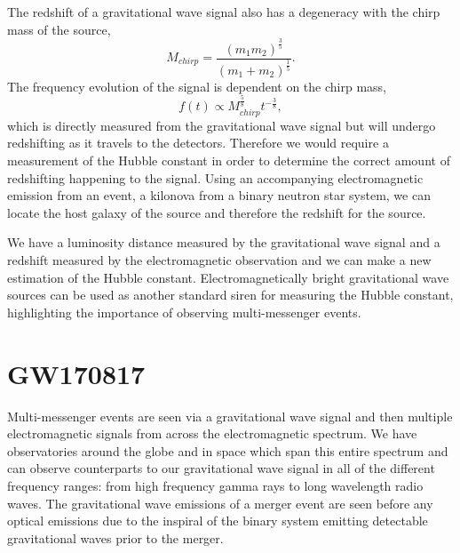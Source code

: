 The redshift of a gravitational wave signal also has a degeneracy with the chirp mass of the source,
%
\begin{equation}
M_{chirp} = \frac{(m_1 m_2)^{\frac{3}{5}}}{(m_1 + m_2)^{\frac{1}{5}}}.
\end{equation}
%
The frequency evolution of the signal is dependent on the chirp mass,
%
\begin{equation}
f(t) \propto M_{chirp}^{\frac{5}{8}}t^{-\frac{3}{8}},
\end{equation}
%
which is directly measured from the gravitational wave signal but will undergo redshifting as it travels to the detectors. Therefore we would require a measurement of the Hubble constant in order to determine the correct amount of redshifting happening to the signal. Using an accompanying electromagnetic emission from an event, a kilonova from a binary neutron star system, we can locate the host galaxy of the source and therefore the redshift for the source.

We have a luminosity distance measured by the gravitational wave signal and a redshift measured by the electromagnetic observation and we can make a new estimation of the Hubble constant. Electromagnetically bright gravitational wave sources can be used as another standard siren for measuring the Hubble constant, highlighting the importance of observing multi-messenger events.

\section{GW170817}

Multi-messenger events are seen via a gravitational wave signal and then multiple electromagnetic signals from across the electromagnetic spectrum. We have observatories around the globe and in space which span this entire spectrum and can observe counterparts to our gravitational wave signal in all of the different frequency ranges: from high frequency gamma rays to long wavelength radio waves. The gravitational wave emissions of a merger event are seen before any optical emissions due to the inspiral of the binary system emitting detectable gravitational waves prior to the merger.

